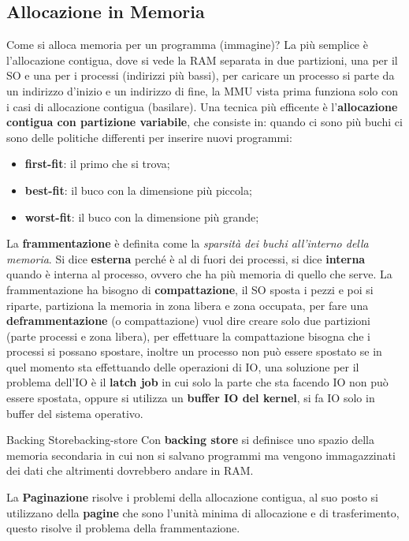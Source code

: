 \documentclass[12pt]{article}
\begin{document}
\subsection{Allocazione in Memoria}
Come si alloca memoria per un programma (immagine)? La pi\`u semplice \`e l'allocazione contigua, dove si vede la RAM separata in due partizioni, una per il SO e una per i processi (indirizzi pi\`u bassi), per caricare un processo si parte da un indirizzo d'inizio e un indirizzo di fine, la MMU vista prima funziona solo con i casi di allocazione contigua (basilare). Una tecnica pi\`u efficente \`e l'\textbf{allocazione contigua con partizione variabile}, che consiste in: quando ci sono pi\`u buchi ci sono delle politiche differenti per inserire nuovi programmi:
\begin{itemize}
  \item \textbf{first-fit}: il primo che si trova;
  \item \textbf{best-fit}: il buco con la dimensione pi\`u piccola;
  \item \textbf{worst-fit}: il buco con la dimensione pi\`u grande;
\end{itemize}
La \textbf{frammentazione} \`e definita come la \emph{sparsit\`a dei buchi all'interno della memoria}. Si dice \textbf{esterna} perch\'e \`e al di fuori dei processi, si dice \textbf{interna} quando \`e interna al processo, ovvero che ha pi\`u memoria di quello che serve. La frammentazione ha bisogno di \textbf{compattazione}, il SO sposta i pezzi e poi si riparte, partiziona la memoria in zona libera e zona occupata, per fare una \textbf{deframmentazione} (o compattazione) vuol dire creare solo due partizioni (parte processi e zona libera), per effettuare la compattazione bisogna che i processi si possano spostare, inoltre un processo non pu\`o essere spostato se in quel momento sta effettuando delle operazioni di IO, una soluzione per il problema dell'IO \`e il \textbf{latch job} in cui solo la parte che sta facendo IO non pu\`o essere spostata, oppure si utilizza un \textbf{buffer IO del kernel}, si fa IO solo in buffer del sistema operativo.
\begin{definition}{Backing Store}{backing-store}
  Con \textbf{backing store} si definisce uno spazio della memoria secondaria in cui non si salvano programmi ma vengono immagazzinati dei dati che altrimenti dovrebbero andare in RAM.
\end{definition}
La \textbf{Paginazione} risolve i problemi della allocazione contigua, al suo posto si utilizzano della \textbf{pagine} che sono l'unit\`a minima di allocazione e di trasferimento, questo risolve il problema della frammentazione.
\end{document}
